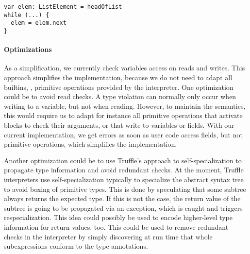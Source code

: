 \begin{lstlisting}[caption={Example for dynamic type checks not corresponding to existing checks.},escapechar=|,label={ex:pathological-case},float,floatplacement=htb]
var elem: ListElement = headOfList
while (...) {
  elem = elem.next
}
\end{lstlisting}

\paragraph{Optimizations}


As a simplification, we currently check variables access on reads and writes.
This approach simplifies the implementation, because we do not need to
adapt all builtins, \ie, primitive operations provided by the interpreter.
One optimization could be to avoid read checks.
A type violation can normally only occur when writing to a variable,
but not when reading.
However, to maintain the semantics, this would require us to adapt for instance
all primitive operations that activate blocks to check their arguments,
or that write to variables or fields.
With our current implementation,
we get errors as soon as user code access fields, but not primitive operations,
which simplifies the implementation.


Another optimization could be to use Truffle's approach to 
self-specialization\citep{Wurthinger:2012:SelfOptAST}
to propagate type information and avoid redundant checks.
At the moment, Truffle interpreters use self-specialization typically to 
specialize the abstract syntax tree to avoid boxing of primitive types.
This is done by speculating that some subtree always returns the expected type.
If this is not the case, the return value of the subtree is going to be
propagated via an exception, which is caught and triggers respecialization.
This idea could possibly be used to encode higher-level type information for
return values, too.
This could be used to remove redundant checks in the interpreter
by simply discovering at run time that whole subexpressions conform to the
type annotations.

